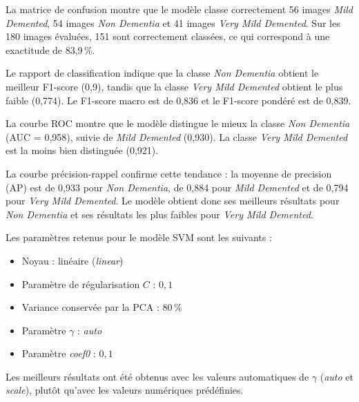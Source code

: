 \documentclass[12pt,twoside,letterpaper]{article}
\begin{document}
La matrice de confusion montre que le modèle classe correctement 56 images
\textit{Mild Demented}, 54 images \textit{Non Dementia} et 41 images
\textit{Very Mild Demented}. Sur les 180 images évaluées, 151 sont correctement
classées, ce qui correspond à une exactitude de 83,9\,\%.\newline\newline

Le rapport de classification indique que la classe \textit{Non Dementia}
obtient le meilleur F1-score (0,9), tandis que la classe
\textit{Very Mild Demented} obtient le plus faible (0,774). Le F1-score macro
est de 0,836 et le F1-score pondéré est de 0,839.
\newline\newline

La courbe ROC montre que le modèle distingue le mieux la classe \textit{Non Dementia} 
(AUC = 0,958), suivie de \textit{Mild Demented} (0,930). 
La classe \textit{Very Mild Demented} est la moins bien distinguée (0,921).\newline\newline

La courbe précision-rappel confirme cette tendance : la moyenne de precision (AP) 
est de 0,933 pour \textit{Non Dementia}, de 0,884 pour \textit{Mild Demented} et 
de 0,794 pour \textit{Very Mild Demented}. Le modèle obtient donc ses meilleurs 
résultats pour \textit{Non Dementia} et ses résultats les plus faibles pour 
\textit{Very Mild Demented}.\newline\newline

Les paramètres retenus pour le modèle SVM sont les suivants :
\begin{itemize}
    \item Noyau : linéaire (\textit{linear})
    \item Paramètre de régularisation \(C\) : \(0{,}1\)
    \item Variance conservée par la PCA : \(80\,\%\)
    \item Paramètre \(\gamma\) : \textit{auto}
    \item Paramètre \textit{coef0} : \(0{,}1\)
\end{itemize}
\vspace{0.5\baselineskip}
Les meilleurs résultats ont été obtenus avec les valeurs automatiques de
\(\gamma\) (\textit{auto} et \textit{scale}), plutôt qu'avec les valeurs
numériques prédéfinies.

\newpage
\end{document}
